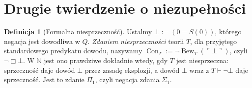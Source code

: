 \documentclass[11pt,a4paper]{article}
\numberwithin{equation}{section}
\theoremstyle{plain}
\theoremstyle{definition}
\newtheorem{definicja}[twierdzenie]{Definicja}
\theoremstyle{remark}
\begin{document}
\section{Drugie twierdzenie o niezupełności}\label{sec:drugie-twierdzenie}
\begin{definicja}[Formalna niesprzeczność]\label{res:12:1}
Ustalmy $\bot:=(0=S(0))$, którego negacja jest dowodliwa w $Q$. \emph{Zdaniem niesprzeczności} teorii $T$, dla przyjętego standardowego predykatu dowodu, nazywamy $\operatorname{Con}_T:=\neg\operatorname{Bew}_T(\ulcorner\bot\urcorner)$, czyli $\neg\Box\bot$. W $\mathbb N$ jest ono prawdziwe dokładnie wtedy, gdy $T$ jest niesprzeczna: sprzeczność daje dowód $\bot$ przez zasadę eksplozji, a dowód $\bot$ wraz z $T\vdash\neg\bot$ daje sprzeczność. Jest to zdanie $\Pi_1$, czyli negacja zdania $\Sigma_1$.
\end{definicja}
\end{document}
